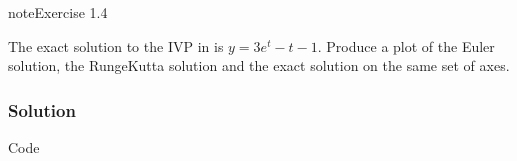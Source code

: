 \documentclass[letterpaper,10pt,english]{jupyterBook}
\begin{document}
\begin{sphinxadmonition}{note}{Exercise 1.4}

\sphinxAtStartPar
The exact solution to the IVP in {\hyperref[\detokenize{1_IVPs/1.7_Exercises:ex1-1}]{}} is \(y=3e^t - t - 1\). Produce a plot of the Euler solution, the Runge\sphinxhyphen{}Kutta solution and the exact solution on the same set of axes.
\subsubsection*{Solution}

\sphinxAtStartPar
Code

\begin{sphinxVerbatim}[commandchars=\\\{\}]
   

 
           



\end{sphinxVerbatim}
\end{sphinxadmonition}
\end{document}
